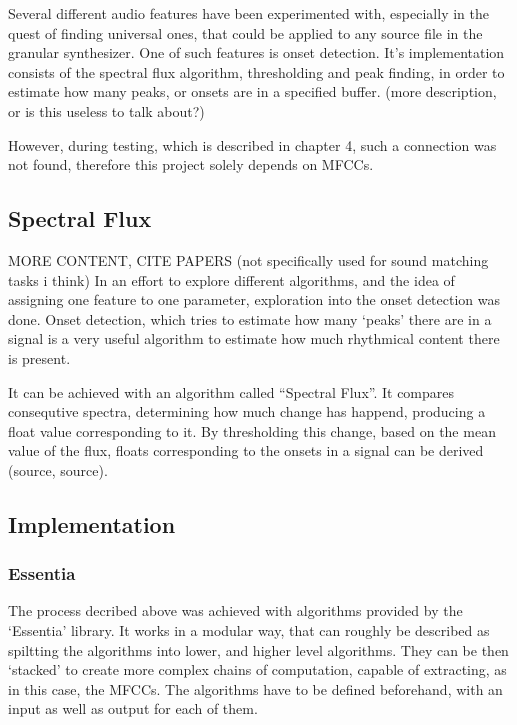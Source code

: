 Several different audio features have been experimented with,
especially in the quest of finding universal ones, that could be
applied to any source file in the granular synthesizer. One of such
features is onset detection. It's implementation consists of the
spectral flux algorithm, thresholding and peak finding, in order to
estimate how many peaks, or onsets are in a specified buffer. (more
description, or is this useless to talk about?)

However, during testing, which is described in chapter 4, such a
connection was not found, therefore this project solely depends on MFCCs.

\subsection{Spectral Flux}
MORE CONTENT, CITE PAPERS (not specifically used for sound matching
tasks i think)
In an effort to explore different algorithms, and the idea of
assigning one feature to one parameter, exploration into the
onset detection was done.
Onset detection, which tries to estimate how many `peaks' there are
in a signal is a very useful algorithm to estimate how much rhythmical
content there is present.

It can be achieved with an algorithm called ``Spectral Flux''. It
compares consequtive spectra, determining how much change has happend,
producing a float value corresponding to it. By thresholding this
change, based on the mean value of the flux, floats corresponding to
the onsets in a signal can be derived (source, source).

\subsection{Implementation}
\subsubsection{Essentia}

The process decribed above was achieved with algorithms provided by
the `Essentia' library\cite{noauthor_homepage_nodate}. It works in a
modular way, that can roughly be described as spiltting the algorithms
into lower, and higher level algorithms. They can be then `stacked' to
create more complex chains of computation, capable of extracting, as
in this case, the MFCCs. The algorithms have to be defined beforehand,
with an input as well as output for each of them.

